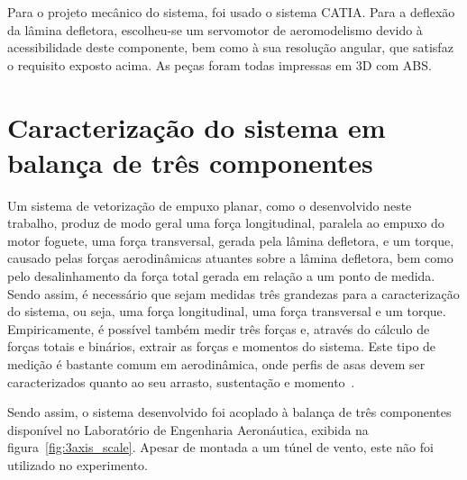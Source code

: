 Para o projeto mecânico do sistema, foi usado o sistema CATIA\@. Para a deflexão da lâmina defletora, escolheu-se um servomotor de aeromodelismo devido à acessibilidade deste componente, bem como à sua resolução angular, que satisfaz o requisito exposto acima. As peças foram todas impressas em 3D com ABS\@.

\section{Caracterização do sistema em balança de três componentes}\label{sec:method_3axis_measurement}

Um sistema de vetorização de empuxo planar, como o desenvolvido neste trabalho, produz de modo geral uma força longitudinal, paralela ao empuxo do motor foguete, uma força transversal, gerada pela lâmina defletora, e um torque, causado pelas forças aerodinâmicas atuantes sobre a lâmina defletora, bem como pelo desalinhamento da força total gerada em relação a um ponto de medida. Sendo assim, é necessário que sejam medidas três grandezas para a caracterização do sistema, ou seja, uma força longitudinal, uma força transversal e um torque. Empiricamente, é possível também medir três forças e, através do cálculo de forças totais e binários, extrair as forças e momentos do sistema. Este tipo de medição é bastante comum em aerodinâmica, onde perfis de asas devem ser caracterizados quanto ao seu arrasto, sustentação e momento~\cite{anderson}.

Sendo assim, o sistema desenvolvido foi acoplado à balança de três componentes disponível no Laboratório de Engenharia Aeronáutica, exibida na figura~\ref{fig:3axis_scale}. Apesar de montada a um túnel de vento, este não foi utilizado no experimento.

